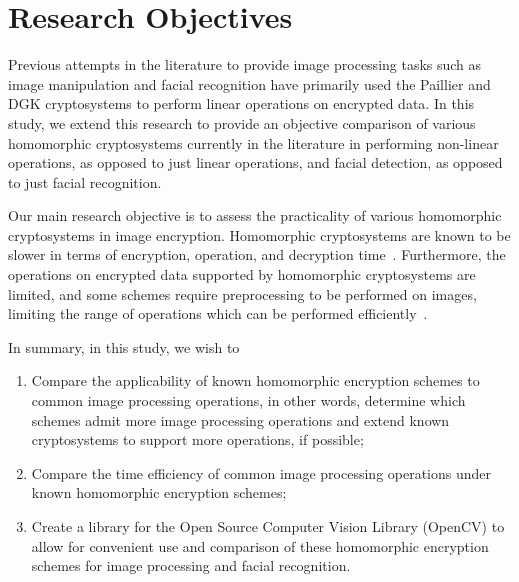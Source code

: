 \section{Research Objectives}

Previous attempts in the literature to provide image processing tasks such as image manipulation \cite{ziad_cryptoimg:_2016} and  facial recognition \cite{hutchison_privacy-preserving_2009} have primarily used the Paillier and DGK cryptosystems to perform linear operations on encrypted data. In this study, we extend this research to provide an objective comparison of various homomorphic cryptosystems currently in the literature in performing non-linear operations, as opposed to just linear operations, and facial detection, as opposed to just facial recognition.

Our main research objective is to assess the practicality of various homomorphic cryptosystems in image encryption. Homomorphic cryptosystems are known to be slower in terms of encryption, operation, and decryption time~\cite{sen_homomorphic_2013}. Furthermore, the operations on encrypted data supported by homomorphic cryptosystems are limited, and some schemes require preprocessing to be performed on images, limiting the range of operations which can be performed efficiently~\cite{li_elliptic_2012}.

In summary, in this study, we wish to
\begin{enumerate}
    \item Compare the applicability of known homomorphic encryption schemes to common image processing operations, in other words, determine which schemes admit more image processing operations and extend known cryptosystems to support more operations, if possible;
    \item Compare the time efficiency of common image processing operations under known homomorphic encryption schemes;
    \item Create a library for the Open Source Computer Vision Library (OpenCV) to allow for convenient use and comparison of these homomorphic encryption schemes for image processing and facial recognition.
\end{enumerate}
